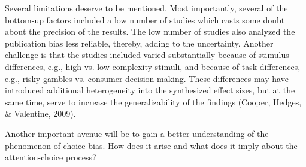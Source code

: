 \documentclass{article}
\begin{document}


Several limitations deserve to be mentioned. Most importantly, several of the bottom-up factors included a low number of studies which casts some doubt about the precision of the results. The low number of studies also analyzed the publication bias less reliable, thereby, adding to the uncertainty. Another challenge is that the studies included varied substantially because of stimulus differences, e.g., high vs. low complexity stimuli, and because of task differences, e.g., risky gambles vs. consumer decision-making. These differences may have introduced additional heterogeneity into the synthesized effect sizes, but at the same time, serve to increase the generalizability of the findings (Cooper, Hedges, \& Valentine, 2009). 

Another important avenue will be to gain a better understanding of the phenomenon of choice bias. How does it arise and what does it imply about the attention-choice process?  



\end{document}
